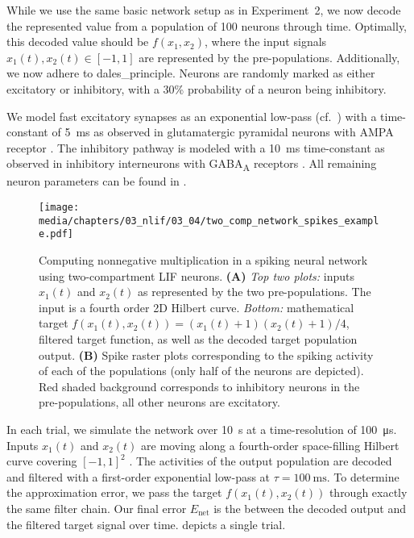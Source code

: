 While we use the same basic network setup as in Experiment~2, we now decode the represented value from a population of \num{100} neurons through time.
Optimally, this decoded value should be $f(x_1, x_2)$, where the input signals $x_1(t), x_2(t) \in [-1, 1]$ are represented by the pre-populations.
Additionally, we now adhere to \gls{dales_principle}.
Neurons are randomly marked as either excitatory or inhibitory, with a 30\% probability of a neuron being inhibitory.

We model fast excitatory synapses as an exponential low-pass (cf.~) with a time-constant of \SI{5}{\milli\second} as observed in glutamatergic pyramidal neurons with AMPA receptor \citep{jonas1993quantal}.
The inhibitory pathway is modeled with a \SI{10}{\milli\second} time-constant as observed in inhibitory interneurons with GABA\textsubscript{A} receptors \citep{gupta2000organizing}.
All remaining neuron parameters can be found in .


\begin{figure}
	\texttt{[image: media/chapters/03\_nlif/03\_04/two\_comp\_network\_spikes\_example.pdf]}
	\caption[Computing nonnegative multiplication in a spiking neural network using two-compartment LIF neurons]{Computing nonnegative multiplication in a spiking neural network using two-compartment LIF neurons.
	\textbf{(A)} \emph{Top two plots:} inputs $x_1(t)$ and $x_2(t)$ as represented by the two pre-populations. The input is a fourth order 2D Hilbert curve. \emph{Bottom:} mathematical target $f(x_1(t), x_2(t)) = (x_1(t) + 1) (x_2(t) + 1) / 4$, filtered target function, as well as the decoded target population output.
	\textbf{(B)} Spike raster plots corresponding to the spiking activity of each of the populations (only half of the neurons are depicted). Red shaded background corresponds to inhibitory neurons in the pre-populations, all other neurons are excitatory.}
	\label{fig:two_comp_lif_spiking_example}
\end{figure}

In each trial, we simulate the network over \SI{10}{\second} at a time-resolution of \SI{100}{\micro\second}.
Inputs $x_1(t)$ and $x_2(t)$ are moving along a fourth-order space-filling Hilbert curve covering $[-1, 1]^2$ \citep{hilbert1891uber}.
The activities of the output population are decoded and filtered with a first-order exponential low-pass at $\tau = \SI{100}{\milli\second}$.
To determine the approximation error, we pass the target $f(x_1(t), x_2(t))$ through exactly the same filter chain.
Our final error $E_\mathrm{net}$ is the \NRMSE between the decoded output and the filtered target signal over time.
 depicts a single trial.

